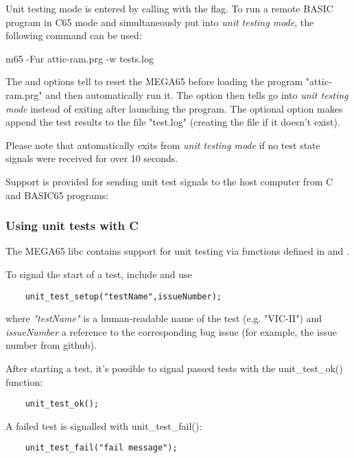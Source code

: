 Unit testing mode is entered by calling  with the  flag. 
To run a remote BASIC program in C65 mode and simultaneously put 
into \textit{unit testing mode}, the following command can be used:

\begin{screenoutput}
    m65 -Fur attic-ram.prg -w tests.log
\end{screenoutput}

The  and  options tell  to reset the MEGA65
before loading the program "attic-ram.prg" and then automatically run it. 
The  option then tells  go into \textit{unit testing mode} 
instead of exiting after launching the program.
The optional  option makes  append the test results to the 
file "test.log" (creating the file if it doesn't exist). 

Please note that  automatically exits from \textit{unit testing mode}
if no test state signals were received for over 10 seconds.

Support is provided for sending unit test signals to the host computer from
C and BASIC65 programs:

\subsubsection{Using unit tests with C}

The MEGA65 libc contains support for unit testing via functions defined in 
 and . 

To signal the start of a test, include  and use

\begin{verbatim}
    unit_test_setup("testName",issueNumber);
\end{verbatim}

where \textit{"testName"} is a human-readable name of the test (e.g. 
"VIC-II") and \textit{issueNumber} a reference to the corresponding
bug issue (for example, the issue number from github).

After starting a test, it's possible to signal passed tests with 
the unit\_test\_ok() function:

\begin{verbatim}
    unit_test_ok();
\end{verbatim}

A failed test is signalled with unit\_test\_fail():

\begin{verbatim}
    unit_test_fail("fail message");
\end{verbatim}

